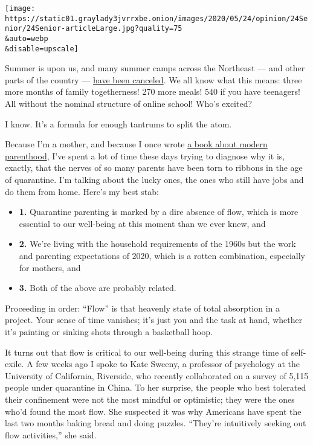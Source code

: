 \texttt{[image: https://static01.graylady3jvrrxbe.onion/images/2020/05/24/opinion/24Senior/24Senior-articleLarge.jpg?quality=75\\\&auto=webp\\\&disable=upscale]}

Summer is upon us, and many summer camps across the Northeast --- and
other parts of the country ---
\href{https://www.nytimes3xbfgragh.onion/2020/05/22/nyregion/summer-camp-coronavirus.html?searchResultPosition=1}{have
been canceled}. We all know what this means: three more months of family
togetherness! 270 more meals! 540 if you have teenagers! All without the
nominal structure of online school! Who's excited?

I know. It's a formula for enough tantrums to split the atom.

Because I'm a mother, and because I once wrote
\href{https://www.nytimes3xbfgragh.onion/2014/02/02/books/review/all-joy-and-no-fun-by-jennifer-senior.html}{a
book about modern parenthood}, I've spent a lot of time these days
trying to diagnose why it is, exactly, that the nerves of so many
parents have been torn to ribbons in the age of quarantine. I'm talking
about the lucky ones, the ones who still have jobs and do them from
home. Here's my best stab:

\begin{itemize}
\item
  \textbf{1.} Quarantine parenting is marked by a dire absence of flow,
  which is more essential to our well-being at this moment than we ever
  knew, and
\item
  \textbf{2.} We're living with the household requirements of the 1960s
  but the work and parenting expectations of 2020, which is a rotten
  combination, especially for mothers, and
\item
  \textbf{3.} Both of the above are probably related.
\end{itemize}

Proceeding in order: ``Flow'' is that heavenly state of total absorption
in a project. Your sense of time vanishes; it's just you and the task at
hand, whether it's painting or sinking shots through a basketball hoop.

It turns out that flow is critical to our well-being during this strange
time of self-exile. A few weeks ago I spoke to Kate Sweeny, a professor
of psychology at the University of California, Riverside, who recently
collaborated on a survey of 5,115 people under quarantine in China. To
her surprise, the people who best tolerated their confinement were not
the most mindful or optimistic; they were the ones who'd found the most
flow. She suspected it was why Americans have spent the last two months
baking bread and doing puzzles. ``They're intuitively seeking out flow
activities,'' she said.


